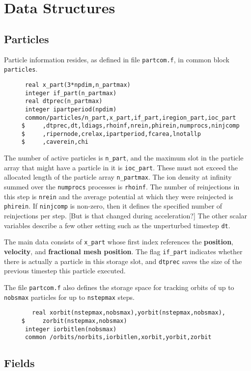 \documentclass[12pt]{article}
\begin{document}
\section{Data Structures}

\subsection{Particles}

Particle information resides, as defined in file \verb!partcom.f!, in
common block \verb!particles!.
\begin{verbatim}
      real x_part(3*npdim,n_partmax)
      integer if_part(n_partmax)
      real dtprec(n_partmax)
      integer ipartperiod(npdim)
      common/particles/n_part,x_part,if_part,iregion_part,ioc_part
     $     ,dtprec,dt,ldiags,rhoinf,nrein,phirein,numprocs,ninjcomp
     $     ,ripernode,crelax,ipartperiod,fcarea,lnotallp
     $     ,caverein,chi
\end{verbatim}
The number of active particles is \verb!n_part!, and the maximum slot
in the particle array that might have a particle in it is
\verb!ioc_part!. These must not exceed the allocated length of the
particle array \verb!n_partmax!. The ion density at infinity summed over the
\verb!numprocs! processes is \verb!rhoinf!. The number of reinjections
in this step is \verb!nrein! and the average potential at which they
were reinjected is \verb!phirein!. If \verb!ninjcomp! is non-zero,
then it defines the specified number of reinjections per step. [But is
  that changed during acceleration?] 
The other scalar variables describe a few other setting such as the
unperturbed timestep \verb!dt!. 

The main data consists of \verb!x_part! whose first index references
the {\bf position}, {\bf velocity}, and {\bf fractional mesh
  position}. The flag \verb!if_part! indicates whether there is actually
a particle in this storage slot, and \verb!dtprec! saves the size of
the previous timestep this particle executed.

The file \verb!partcom.f! also defines the storage space for tracking
orbits of up to \verb!nobsmax! particles for up to \verb!nstepmax! steps.
\begin{verbatim}
        real xorbit(nstepmax,nobsmax),yorbit(nstepmax,nobsmax),
     $     zorbit(nstepmax,nobsmax)
      integer iorbitlen(nobsmax)
      common /orbits/norbits,iorbitlen,xorbit,yorbit,zorbit
\end{verbatim}


\subsection{Fields}
\end{document}
